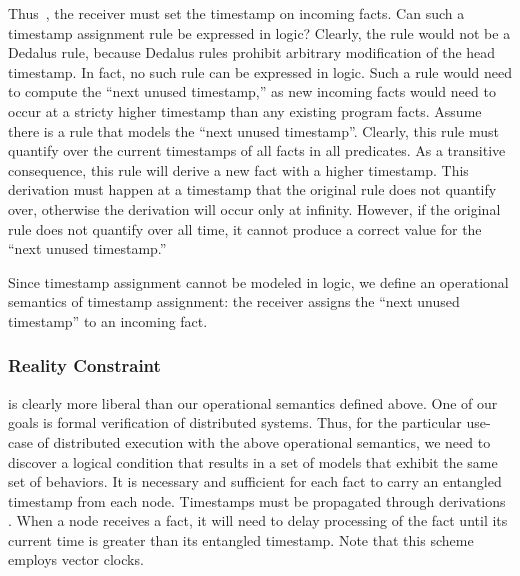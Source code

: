 Thus~, the receiver must set the timestamp on incoming  facts.  Can such a timestamp assignment rule be expressed in logic?  Clearly, the rule would not be a Dedalus rule, because Dedalus rules prohibit arbitrary modification of the head timestamp.  In fact, no such rule can be expressed in logic.  Such a rule would need to compute the ``next unused timestamp,''  as new incoming facts would need to occur at a stricty higher timestamp than any existing program facts.  Assume there is a rule that models the ``next unused timestamp''.  Clearly, this rule must quantify over the current timestamps of all facts in all predicates.  As a transitive consequence, this rule will derive a new fact with a higher timestamp.  This derivation must happen at a timestamp that the original rule does not quantify over, otherwise the derivation will occur only at infinity.  However, if the original rule does not quantify over all time, it cannot produce a correct value for the ``next unused timestamp.'' 

Since timestamp assignment cannot be modeled in logic, we define an operational semantics of timestamp assignment:   the receiver assigns the ``next unused timestamp'' to an incoming fact.~

\subsubsection{Reality Constraint}

 is clearly more liberal than our operational semantics defined above.  One of our goals is formal verification of distributed systems.  Thus, for the particular use-case of distributed execution with the above operational semantics, we need to discover a logical condition that results in a set of models that exhibit the same set of behaviors.  It is  necessary and sufficient for each fact to carry an entangled timestamp from each node.  Timestamps must be propagated through derivations .  When a node receives a fact, it will need to delay processing of the fact until its current time is greater than its entangled timestamp.  Note that this scheme employs vector clocks.

